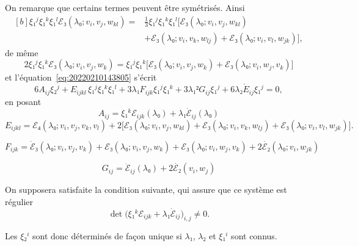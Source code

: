 \documentclass[12pt, final]{amsart}
\begin{document}
On remarque que certains termes peuvent être symétrisés. Ainsi
\begin{equation}
  \begin{aligned}[b]
    ξ₁^jξ₁^kξ₁^lℰ₃(λ₀; v_i, v_j, w_{kl})={}&\tfrac13ξ₁^jξ₁^kξ₁^l\bigl[
    ℰ₃(λ₀; v_i, v_j, w_{kl})\\
    &+ℰ₃(λ₀; v_i, v_k, w_{lj})+ℰ₃(λ₀; v_i, v_l, w_{jk})\bigr],
  \end{aligned}
\end{equation}
de même
\begin{equation}
  2ξ₁^jξ₁^kℰ₃(λ₀; v_i, v_j, w_k)=ξ₁^jξ₁^k\bigl[ℰ₃(λ₀; v_i, v_j, w_k)
  +ℰ₃(λ₀; v_i, w_j, v_k)\bigr]
\end{equation}
et l'équation~\eqref{eq:20220210143805} s'écrit
\begin{equation}
  6A_{ij}ξ₂^j+E_{ijkl}\,ξ₁^jξ₁^kξ₁^l+3λ₁F_{ijk}ξ₁^jξ₁^k+3λ₁²G_{ij}ξ₁^j
  +6λ₂\mathring{E}_{ij}ξ₁^j=0,
\end{equation}
en posant
\begin{equation}
  A_{ij}=ξ₁^kℰ_{ijk}(λ₀)+λ₁\dot{ℰ}_{ij}(λ₀)
\end{equation}
\begin{equation}
  E_{ijkl}=ℰ₄(λ₀; v_i, v_j, v_k, v_l)+2\bigl[ℰ₃(λ₀; v_i, v_j, w_{kl})
  +ℰ₃(λ₀; v_i, v_k, w_{lj})+ℰ₃(λ₀; v_i, v_l, w_{jk})\bigr].
\end{equation}

\begin{equation}
  F_{ijk}=\dot{ℰ}₃(λ₀; v_i, v_j, v_k)+ℰ₃(λ₀; v_i, v_j, w_k)
  +ℰ₃(λ₀; v_i, w_j, v_k)+2\dot{ℰ₂}(λ₀; v_i, w_{jk})
\end{equation}

\begin{equation}
  G_{ij}=\ddot{ℰ}_{ij}(λ₀)+2\dot{ℰ₂}(v_i, w_j)
\end{equation}

On supposera satisfaite la condition suivante, qui assure que ce système est régulier
\begin{equation}
  \det\bigl(ξ₁^kℰ_{ijk}+λ₁\dot{ℰ}_{ij}\bigr)_{i,j}\neq0.
\end{equation}

Les \(ξ₂^i\) sont donc déterminés de façon unique si \(λ₁\), \(λ₂\) et \(ξ₁^i\)
sont connus.
\end{document}
